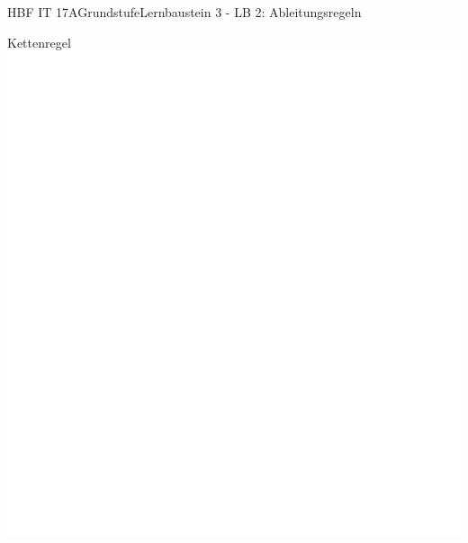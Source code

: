 \documentclass[oneside,openany,headings=optiontotoc,11pt,numbers=noenddot]{scrreprt}
\begin{document}
\begin{worksheet}{HBF IT 17A}{Grundstufe}{Lernbaustein 3 - LB 2: Ableitungsregeln}
\begin{framed}
		\end{framed}
		\begin{framed}
			\tiny{\color{codegray}Kettenregel}\\
			\includegraphics[scale=0.73]{../empty.jpg}
		\end{framed}
	\end{worksheet}
\end{document}

